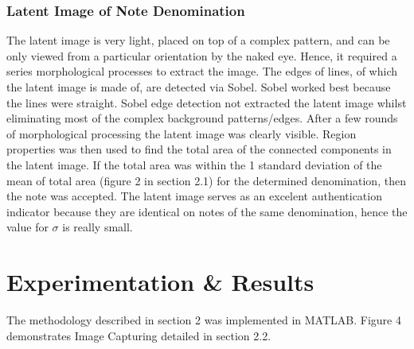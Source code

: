 \documentclass{article}
\begin{document}
\subsubsection{Latent Image of Note Denomination}
The latent image is very light, placed on top of a complex pattern, and can be only viewed from a particular orientation by the naked eye. Hence, it required a series morphological processes to extract the image. The edges of lines, of which the latent image is made of, are detected via Sobel. Sobel worked best because the lines were straight. Sobel edge detection not extracted the latent image whilst eliminating most of the complex background patterns/edges. After a few rounds of morphological processing the latent image was clearly visible. Region properties was then used to find the total area of the connected components in the latent image. If the total area was within the 1 standard deviation of the mean of total area (figure 2 in section 2.1) for the determined denomination, then the note was accepted. The latent image serves as an excelent authentication indicator because they are identical on notes of the same denomination, hence the value for $\sigma$ is really small.

\section{Experimentation \& Results}
\label{sec:resultsanddiscussion}
The methodology described in section 2 was implemented in MATLAB. Figure 4 demonstrates Image Capturing detailed in section 2.2.
\end{document}
